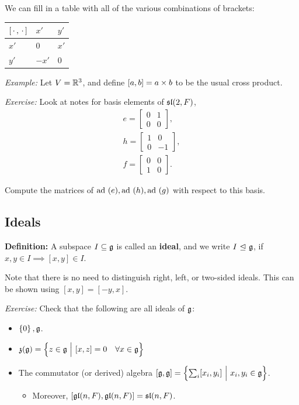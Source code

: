 We can fill in a table with all of the various combinations of brackets:

\begin{center}
\begin{tabular}{l|ll}
$[{\,\cdot\,}, {\,\cdot\,}]$ & $x'$  & $y'$ \\ \hline
$x'$                                               & $0$   & $x'$ \\
$y'$                                               & $-x'$ & $0$
\end{tabular}
\end{center}

\emph{Example:} Let \(V = {\mathbb{R}}^3\), and define \([a,b] = a\times b\) to
be the usual cross product.

\emph{Exercise:} Look at notes for basis elements of \({\mathfrak{sl}}(2, F)\),
\begin{align*}
e=\left[\begin{array}{ll}{0} & {1} \\ {0} & {0}\end{array}\right],\\
h=\left[\begin{array}{cc}{1} & {0} \\ {0} & {-1}\end{array}\right],\\
f=\left[\begin{array}{ll}{0} & {0} \\ {1} & {0}\end{array}\right]
.\end{align*}

Compute the matrices of \(\mathrm{ad}~(e), \mathrm{ad}~(h), \mathrm{ad}~(g)\) with respect to this
basis.

\hypertarget{ideals}{%
\subsection{Ideals}\label{ideals}}

\textbf{Definition:} A subspace \(I \subseteq {\mathfrak{g}}\) is called an
\textbf{ideal}, and we write \(I {~\trianglelefteq~} {\mathfrak{g}}\), if
\(x,y \in I \implies [x,y]\in I\).

Note that there is no need to distinguish right, left, or two-sided
ideals. This can be shown using \([x,y] = [-y, x]\).

\emph{Exercise:} Check that the following are all ideals of \({\mathfrak{g}}\):

\begin{itemize}
\tightlist
\item
  \(\left\{{0}\right\}, {\mathfrak{g}}\).
\item
  \(\mathfrak z ({\mathfrak{g}}) = \left\{{z\in {\mathfrak{g}} {~\mathrel{\Big|}~} [x, z] = 0\quad \forall x\in {\mathfrak{g}}}\right\}\)
\item
  The commutator (or derived) algebra
  \([{\mathfrak{g}}, {\mathfrak{g}}] = \left\{{\sum_i [x_i, y_i] {~\mathrel{\Big|}~} x_i, y_i \in {\mathfrak{g}}}\right\}\).

  \begin{itemize}
  \tightlist
  \item
    Moreover, \([{\mathfrak{gl}}(n, F),{\mathfrak{gl}}(n, F) ] = {\mathfrak{sl}}(n, F)\).
  \end{itemize}
\end{itemize}

